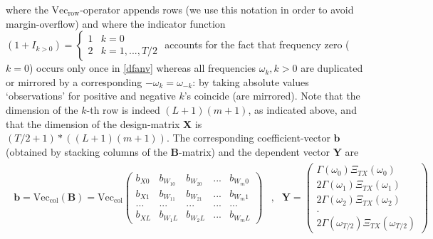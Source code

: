 \documentclass[11pt]{article}
\begin{document}
where the $\textrm{Vec}_\textrm{row}$-operator appends rows (we use this notation in order to avoid margin-overflow) and where the indicator function $(1+I_{k>0})=\left\{\begin{array}{cc}1&k=0\\2&k=1,...,T/2\end{array}\right.$ accounts for the fact that frequency zero ($k=0$) occurs only once in \ref{dfanv} whereas 
all frequencies $\omega_k, k>0$ are duplicated or mirrored by a corresponding $-\omega_k=\omega_{-k}$: by taking absolute values `observations' for positive and negative $k$'s coincide (are mirrored). Note that the dimension of the $k$-th row is indeed $(L+1)(m+1)$, as indicated above, and that the dimension of the design-matrix $\mathbf{X}$ is $(T/2+1)*((L+1)(m+1))$.
The corresponding coefficient-vector $\mathbf{b}$  (obtained by stacking columns of the $\mathbf{B}$-matrix) and the dependent vector $\mathbf{Y}$ are
\begin{eqnarray*}
\begin{array}{ccc}
\mathbf{b}=\textrm{Vec}_\textrm{col}(\mathbf{B})=\textrm{Vec}_\textrm{col}\left(\begin{array}{ccccc} b_{X0}&b_{W_10}&b_{W_20}&...&b_{W_m0}\\
b_{X1}&b_{W_11}&b_{W_21}&...&b_{W_m1}\\
...&...&...&...&...\\
b_{XL}&b_{W_1L}&b_{W_2L}&...&b_{W_mL}
\end{array}\right) &,& \mathbf{Y}=\left(\begin{array}{c}\Gamma(\omega_0)\Xi_{TX}(\omega_0)\\ 
2\Gamma(\omega_1)\Xi_{TX}(\omega_1)\\
2\Gamma(\omega_2)\Xi_{TX}(\omega_2)\\
.\\
2\Gamma(\omega_{T/2})\Xi_{TX}(\omega_{T/2})
\end{array}\right)\end{array}
\end{eqnarray*}
\end{document}
